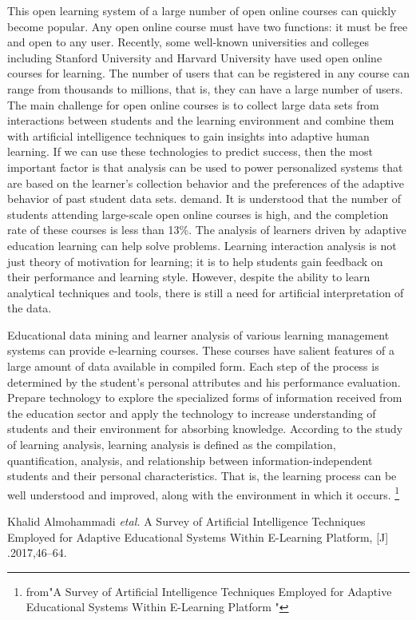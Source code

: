 \documentclass[a4paper,12pt,twocolumn]{article}
\begin{document}
	\par This open learning system of a large number of open online courses can quickly become popular. Any open online course must have two functions: it must be free and open to any user. Recently, some well-known universities and colleges including Stanford University and Harvard University have used open online courses for learning. The number of users that can be registered in any course can range from thousands to millions, that is, they can have a large number of users. The main challenge for open online courses is to collect large data sets from interactions between students and the learning environment and combine them with artificial intelligence techniques to gain insights into adaptive human learning. If we can use these technologies to predict success, then the most important factor is that analysis can be used to power personalized systems that are based on the learner's collection behavior and the preferences of the adaptive behavior of past student data sets. demand. It is understood that the number of students attending large-scale open online courses is high, and the completion rate of these courses is less than 13\%. The analysis of learners driven by adaptive education learning can help solve problems. Learning interaction analysis is not just theory of motivation for learning; it is to help students gain feedback on their performance and learning style. However, despite the ability to learn analytical techniques and tools, there is still a need for artificial interpretation of the data.
	
	\par Educational data mining and learner analysis of various learning management systems can provide e-learning courses. These courses have salient features of a large amount of data available in compiled form. Each step of the process is determined by the student's personal attributes and his performance evaluation. Prepare technology to explore the specialized forms of information received from the education sector and apply the technology to increase understanding of students and their environment for absorbing knowledge. According to the study of learning analysis, learning analysis is defined as the compilation, quantification, analysis, and relationship between information-independent students and their personal characteristics. That is, the learning process can be well understood and improved, along with the environment in which it occurs.
	\footnote{from"A Survey of Artificial Intelligence Techniques Employed for   Adaptive Educational  Systems Within E-Learning Platform	"} 




	\begin{thebibliography}{99}
	    Khalid Almohammadi \emph{etal.} A Survey of Artificial Intelligence Techniques Employed for  Adaptive Educational Systems Within E-Learning Platform, [J] .2017,46--64.
\end{thebibliography}
\end{document}
